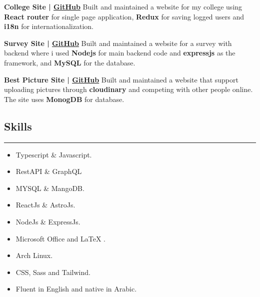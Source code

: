 \documentclass[12pt, a4paper]{article}
\begin{document}
\textbf{College Site | \underline{\href{https://github.com/Murtaza01/collegeApp}{GitHub}}}\smallbreak
Built and maintained a website for my college using \textbf{React router} for single page
application, \textbf{Redux} for saving logged users and 
\textbf{i18n} for internationalization.\bigbreak

\textbf{Survey Site | \underline{\href{https://github.com/Murtaza01/surveyApp}{GitHub}}}\smallbreak
Built and maintained a website for a survey with backend where i used \textbf{Nodejs} for
main backend code and \textbf{expressjs} as the framework, and \textbf{MySQL} for the 
database.\bigbreak

\textbf{Best Picture Site | \underline{\href{https://github.com/Murtaza01/bestpic}{GitHub}}}\smallbreak
Built and maintained a website that support uploading pictures through \textbf{cloudinary} and
competing with other people online. The site uses \textbf{MonogDB} for database.


\subsection*{Skills}
\vspace{-0.4em}
\hrule

\begin{multicols}{2} %
    \begin{itemize}[noitemsep,topsep=0pt]
        \item Typescript \& Javascript.
        \item RestAPI \& GraphQL 
        \item MYSQL \& MangoDB.
        \item ReactJs \& AstroJs.
        \item NodeJs \& ExpressJs.
        \item Microsoft Office and LaTeX .
        \item Arch Linux.
        \item CSS, Sass and Tailwind.
        \item Fluent in English and native in Arabic.
    \end{itemize}
\end{multicols}
  
\end{document}
